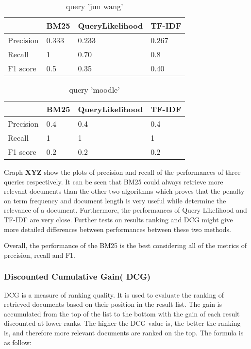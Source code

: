 \begin{table}[]
\centering
\caption{query 'jun wang'}
\label{my-label}
\begin{tabular}{|l|l|l|l|}
\hline
          & BM25  & QueryLikelihood & TF-IDF \\ \hline
Precision & 0.333 & 0.233           & 0.267  \\ \hline
Recall    & 1     & 0.70            & 0.8    \\ \hline
F1 score  & 0.5   & 0.35            & 0.40   \\ \hline
\end{tabular}
\end{table}

\begin{table}[]
\centering
\caption{query 'moodle'}
\label{my-label}
\begin{tabular}{|l|l|l|l|}
\hline
          & BM25 & QueryLikelihood & TF-IDF \\ \hline
Precision & 0.4  & 0.4             & 0.4    \\ \hline
Recall    & 1    & 1               & 1      \\ \hline
F1 score  & 0.2  & 0.2             & 0.2    \\ \hline
\end{tabular}
\end{table}

Graph \textbf{XYZ } show the plots of precision and recall of the performances of three queries respectively. It can be seen that BM25 could always retrieve more relevant documents than the other two algorithms which proves that the penalty  on term frequency and document length is very useful while determine the relevance of a document. Furthermore, the performances of Query Likelihood and TF-IDF are very close. Further tests on results ranking and DCG might give more detailed differences between performances between these two methods.

Overall, the performance of the BM25 is the best considering all of the metrics of precision, recall and F1. 

\subsubsection{Discounted Cumulative Gain( DCG)}

DCG is a measure of ranking quality. It is used to evaluate the ranking of retrieved documents based on their position in the result list. The gain is accumulated from the top of the list to the bottom with the gain of each result discounted at lower ranks. The higher the DCG value is, the better the ranking is, and therefore more relevant documents are ranked on the top. The formula is as follow:

